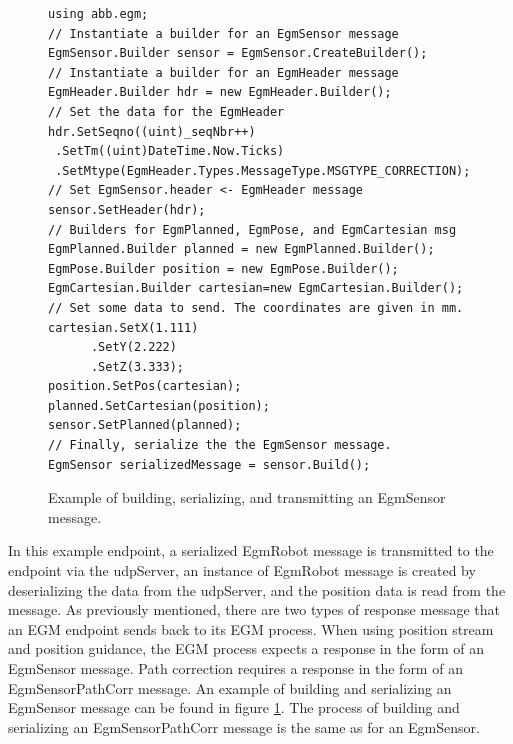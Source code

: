 \documentclass{cslthse-msc}
\begin{document}
\lstset{language=[Sharp]C}
\begin{figure}[H]
    \centering
    \begin{lstlisting}
using abb.egm; 
// Instantiate a builder for an EgmSensor message
EgmSensor.Builder sensor = EgmSensor.CreateBuilder();
// Instantiate a builder for an EgmHeader message
EgmHeader.Builder hdr = new EgmHeader.Builder();
// Set the data for the EgmHeader
hdr.SetSeqno((uint)_seqNbr++)
 .SetTm((uint)DateTime.Now.Ticks)
 .SetMtype(EgmHeader.Types.MessageType.MSGTYPE_CORRECTION);
// Set EgmSensor.header <- EgmHeader message 
sensor.SetHeader(hdr);
// Builders for EgmPlanned, EgmPose, and EgmCartesian msg
EgmPlanned.Builder planned = new EgmPlanned.Builder();
EgmPose.Builder position = new EgmPose.Builder();
EgmCartesian.Builder cartesian=new EgmCartesian.Builder();
// Set some data to send. The coordinates are given in mm.
cartesian.SetX(1.111)
      .SetY(2.222)
      .SetZ(3.333);
position.SetPos(cartesian);
planned.SetCartesian(position);
sensor.SetPlanned(planned);
// Finally, serialize the the EgmSensor message.
EgmSensor serializedMessage = sensor.Build();
\end{lstlisting}
\caption{Example of building, serializing, and transmitting an EgmSensor message.}
\label{fig:build_egm_sensor}
\end{figure}
\vspace{0.5cm}
In this example endpoint, a serialized EgmRobot message is transmitted to the endpoint via the udpServer, an instance of EgmRobot message is created by deserializing the data from the udpServer, and the position data is read from the message. As previously mentioned, there are two types of response message that an EGM endpoint sends back to its EGM process. When using position stream and position guidance, the EGM process expects a response in the form of an EgmSensor message. Path correction requires a response in the form of an EgmSensorPathCorr message. An example of building and serializing an EgmSensor message can be found in figure \ref{fig:build_egm_sensor}. The process of building and serializing an EgmSensorPathCorr message is the same as for an EgmSensor.
\end{document}
